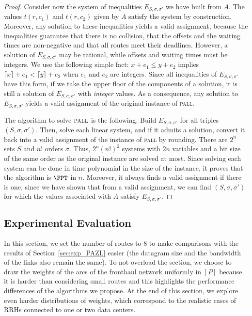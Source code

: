 \documentclass[a4paper,10pt]{journal}
\newcommand\pall{\textsc{pall}\xspace}
\begin{document}
\begin{proof}
Consider now the system of inequalities $E_{S,\sigma,\sigma'}$ we have built from $A$.
The values $t(r,c_1)$ and $t(r,c_2)$ given by $A$ satisfy the system by construction. 
Moreover, any solution to these inequalities yields a valid assignment, because the inequalities guarantee 
that there is no collision, that the offsets and the waiting times are non-negative and that all routes meet their deadlines. However, a solution of $E_{S,\sigma,\sigma'}$ may be rational, while offsets and waiting times must be integers. We use the following simple fact: $x + e_1 \leq y + e_2$ implies $\lceil x \rceil + e_1 < \lceil y \rceil + e_2$ when $e_1$ and $e_2$ are integers. Since all inequalities of $E_{S,\sigma,\sigma'}$ have this form, if we take the upper floor of the components of a solution, it is still a solution of $E_{S,\sigma,\sigma'}$ with \emph{integer} values. As a consequence, any solution to $E_{S,\sigma,\sigma'}$ yields a valid assignment of the original instance of \pall.

The algorithm to solve $\pall$ is the following. Build $E_{S,\sigma,\sigma'}$ for all triples $(S,\sigma,\sigma')$. Then, solve each linear system, and if it admits a solution, convert it back into a
valid assignment of the instance of \pall by rounding. There are $2^n$ sets $S$ and $n!$ orders $\sigma$. Thus, $2^n(n!)^2$ systems with $2n$ variables and a bit size of the same order as the original instance are solved at most. Since solving each system can be done in time polynomial in the size of the instance, it proves that the algorithm is $\FPT$ in $n$. Moreover, it always finds a valid assignment if there is one, since we have shown that from a valid assignment, we can find $(S,\sigma,\sigma')$ for which the values associated with $A$ satisfy $E_{S,\sigma,\sigma'}$.
\end{proof}


    \subsection{Experimental Evaluation}
    \label{sec:resultsPALL}


    In this section, we set the number of routes to $8$ to make comparisons with the results of Section~\ref{sec:exp_PAZL} easier (the datagram size and the bandwidth of the links also remain the same). To not overload the section, we choose to draw the weights of the arcs of the fronthaul network uniformly in $[P]$ because it is harder than considering small routes and this highlights the performance differences of the algorithms we propose. At the end of this section, we explore even harder distributions of weights, which correspond to the realistic cases of RRHs connected to one or two data centers. 
\end{document}
